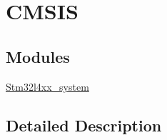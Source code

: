 \hypertarget{group___c_m_s_i_s}{}\section{C\+M\+S\+IS}
\label{group___c_m_s_i_s}
\subsection*{Modules}
\begin{DoxyCompactItemize}
\item 
\mbox{\hyperlink{group__stm32l4xx__system}{Stm32l4xx\+\_\+system}}
\end{DoxyCompactItemize}


\subsection{Detailed Description}
